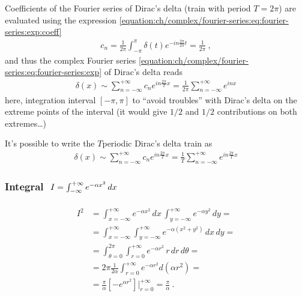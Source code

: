 \documentclass[letterpaper,10pt,english]{jupyterBook}
\begin{document}
\sphinxAtStartPar
Coefficients of the Fourier series of Dirac’s delta (train with period \(T = 2 \pi\)) are evaluated using the expression \eqref{equation:ch/complex/fourier-series:eq:fourier-series:exp:coeff}
\begin{equation*}
\begin{split}c_n = \frac{1}{2 \pi} \int_{-\pi}^{\pi} \delta(t) e^{-i n \frac{2\pi}{2 \pi}t} = \frac{1}{2\pi} \ ,\end{split}
\end{equation*}
\sphinxAtStartPar
and thus the complex Fourier series \eqref{equation:ch/complex/fourier-series:eq:fourier-series:exp} of Dirac’s delta reads
\begin{equation*}
\begin{split}\delta(x) \sim \sum_{n=-\infty}^{+\infty} c_n e^{i n \frac{2\pi}{T}x} = \frac{1}{2 \pi} \sum_{n=-\infty}^{+\infty} e^{i n x}\end{split}
\end{equation*}
\sphinxAtStartPar
{} here, integration interval \([-\pi,\pi]\) to “avoid troubles” with Dirac’s delta on the extreme points of the interval (it would give \(1/2\) and \(1/2\) contributions on both extremes…)

\sphinxAtStartPar
It’s possible to write the \(T\)\sphinxhyphen{}periodic Dirac’s delta train as
\begin{equation*}
\begin{split}\delta(x) \sim \sum_{n=-\infty}^{+\infty} c_n e^{i n \frac{2\pi}{T}x} = \frac{1}{T} \sum_{n=-\infty}^{+\infty} e^{i n \frac{2\pi}{T} x}\end{split}
\end{equation*}

\label{\detokenize{ch/functional-analysis/dirac-delta:integral-e-x2}}\subsubsection*{Integral \protect\(\ I = \int_{-\infty}^{+\infty} e^{-\alpha x^2} \, dx\protect\)}
\begin{equation*}
\begin{split}\begin{aligned}
  I^2 
  & = \int_{x=-\infty}^{+\infty} e^{-\alpha x^2} \, dx \, \int_{y=-\infty}^{+\infty} e^{-\alpha y^2} \, dy = \\
  & = \int_{x=-\infty}^{+\infty} \int_{y=-\infty}^{+\infty} e^{-\alpha (x^2 + y^2)} \, dx \, dy = \\
  & = \int_{\theta=0}^{2\pi} \int_{r=0}^{+\infty} e^{-\alpha r^2} \, r \, dr \, d \theta = \\
  & = 2 \pi \frac{1}{2 \alpha} \int_{r=0}^{+\infty} e^{-\alpha r^2} d \left(\alpha r^2 \right) = \\
  & = \frac{\pi}{\alpha} \left[ - e^{\alpha r^2} \right]\bigg|_{r = 0}^{+\infty} = \frac{\pi}{\alpha} \ .
\end{aligned}\end{split}
\end{equation*}
\sphinxstepscope
\end{document}
